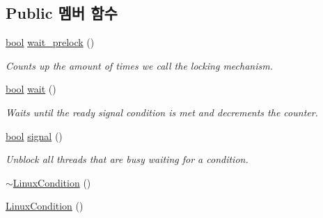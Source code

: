 \subsection*{Public 멤버 함수}
\begin{DoxyCompactItemize}
\item 
\hyperlink{avb__gptp_8h_af6a258d8f3ee5206d682d799316314b1}{bool} \hyperlink{class_linux_condition_aafecb1736d263490a10105a79054db38}{wait\+\_\+prelock} ()
\begin{DoxyCompactList}\small\item\em Counts up the amount of times we call the locking mechanism. \end{DoxyCompactList}\item 
\hyperlink{avb__gptp_8h_af6a258d8f3ee5206d682d799316314b1}{bool} \hyperlink{class_linux_condition_ab86f338cf229c8dd15d854493ff43ff6}{wait} ()
\begin{DoxyCompactList}\small\item\em Waits until the ready signal condition is met and decrements the counter. \end{DoxyCompactList}\item 
\hyperlink{avb__gptp_8h_af6a258d8f3ee5206d682d799316314b1}{bool} \hyperlink{class_linux_condition_a15d354e10ad83f2f71f2bd21aecd04ec}{signal} ()
\begin{DoxyCompactList}\small\item\em Unblock all threads that are busy waiting for a condition. \end{DoxyCompactList}\item 
\hyperlink{class_linux_condition_a9f2eebae9965e48b98b84f650305b750}{$\sim$\+Linux\+Condition} ()
\item 
\hyperlink{class_linux_condition_ac125c16c9bd4211bdcf8c5725a782b59}{Linux\+Condition} ()
\end{DoxyCompactItemize}
